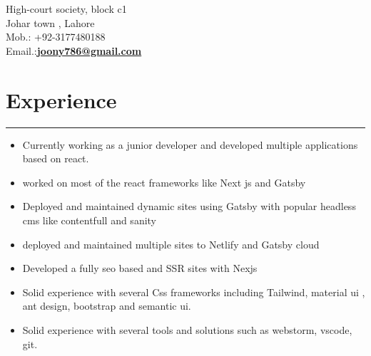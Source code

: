\documentclass[]{junaid}
\begin{document}
\begin{minipage}[t]{0.66\textwidth} 
\hspace*{0pt}\hfill    \\
\hspace*{0pt}\hfill    \\
\hspace*{0pt}\hfill High-court society, block c1 \\
\hspace*{0pt}\hfill Johar town , Lahore \\
\hspace*{0pt}\hfill Mob.: +92-3177480188 \\
\hspace*{0pt}\hfill Email.:\textbf{\href{mailto:joony786@gmail.com}{joony786@gmail.com}} \\
\section{Experience}
\noindent\rule{12.5cm}{0.4pt}
 
\noindent
\begin{minipage}{0.85\textwidth\vspace{2pt}}
\begin{itemize}
\item Currently working as a junior developer and developed multiple applications based on react.
 \item worked on most of the react frameworks like Next js and Gatsby

\item Deployed and maintained dynamic sites using Gatsby with popular headless cms like contentfull and sanity

\item deployed and maintained multiple sites to Netlify and Gatsby cloud

\item Developed a fully seo based and SSR sites with Nexjs

\item Solid experience with several Css frameworks including Tailwind, material ui , ant design, bootstrap and semantic ui.
\item Solid experience with several tools and solutions such as webstorm, vscode, git.


\end{itemize}
\end{minipage}
\end{minipage}
\end{document}
